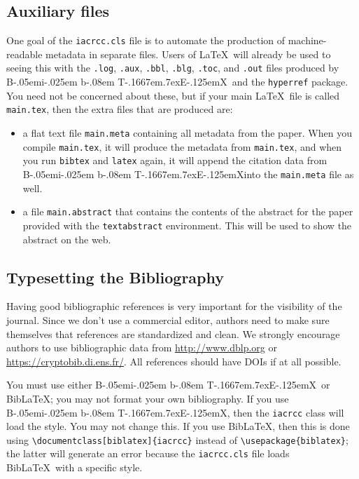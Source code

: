 \documentclass{iacrcc}
\def\BibTeX{{\rm B\kern-.05em{\sc i\kern-.025em b}\kern-.08em
    T\kern-.1667em\lower.7ex\hbox{E}\kern-.125emX}}
\def\BibLaTeX{Bib\LaTeX}
\begin{document}
\subsection{Auxiliary files}
One goal of the \texttt{iacrcc.cls}
  file is to automate the production of machine-readable metadata in
  separate files. Users of \LaTeX\ will already be used to seeing this
  with the \texttt{.log}, \texttt{.aux}, \texttt{.bbl}, \texttt{.blg},
  \texttt{.toc}, and \texttt{.out} files produced by \BibTeX\ 
  and the \texttt{hyperref} package.  You need not be concerned about
  these, but if your main \LaTeX\ file is called \texttt{main.tex},
  then the extra files that are produced are:
\begin{itemize}
\item a flat text file \texttt{main.meta} containing all metadata
  from the paper.  When you compile
  \texttt{main.tex}, it will produce the metadata from
  \texttt{main.tex}, and when you run \texttt{bibtex} and
  \texttt{latex} again, it will append the citation data from
  \BibTeX into the \texttt{main.meta} file as well.
\item a file \texttt{main.abstract} that contains
  the contents of the abstract for the paper provided with the
  \texttt{textabstract} environment. This will be used to show
  the abstract on the web.
\end{itemize}

\subsection{Typesetting the Bibliography}
\label{sec:biblio}

Having good bibliographic references is very important for the
visibility of the journal.  Since we don't use a commercial editor,
authors need to make sure themselves that references are standardized
and clean.  We strongly encourage authors to use bibliographic data
from \url{http://www.dblp.org} or \url{https://cryptobib.di.ens.fr/}.
All references should have DOIs if at all possible.

You must use either \BibTeX\ or \BibLaTeX; you may not format your own bibliography.
If you use \BibTeX, then the \texttt{iacrcc} class will load the
\verb++ style.  You may not change
this. If you use \BibLaTeX, then this is done using
\verb+\documentclass[biblatex]{iacrcc}+ instead of
\verb+\usepackage{biblatex}+; the latter will generate an error
because the \texttt{iacrcc.cls} file loads \BibLaTeX\ with a
specific style.
\end{document}
